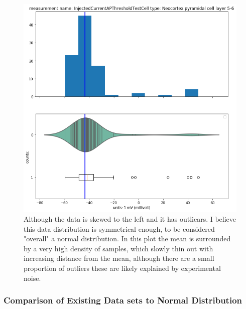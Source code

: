 \begin{figure} 
    \begin{center}
    \includegraphics[scale=0.8]{figures/mean_well_served2.png}
    \end{center}
    \caption[AP Amplitude Data Distribution, Layer 5 Pyramidal Cell]{Although the data is skewed to the left and it has outliears. I believe this data distribution is symmetrical enough, to be considered "overall" a normal distribution. In this plot the mean is surrounded by a very high density of samples, which slowly thin out with increasing distance from the mean, although there are a small proportion of outliers these are likely explained by experimental noise.}
\end{figure}   
 

\subsubsection{Comparison of Existing Data sets to Normal Distribution}    

